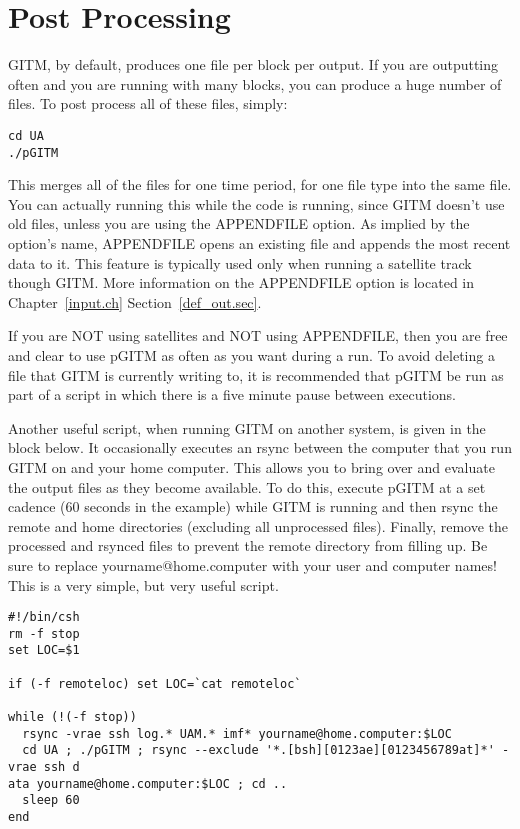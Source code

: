 \section{Post Processing}
\label{post_process.sec}

GITM, by default, produces one file per block per output.  If you are outputting often and you are running with many blocks, you can produce a huge number of files.  To post process all of these files, simply:

\begin{verbatim}
cd UA
./pGITM
\end{verbatim}

This merges all of the files for one time period, for one file type into the same file.  You can actually running this while the code is running, since GITM doesn't use old files, unless you are using the APPENDFILE option.  As implied by the option's name, APPENDFILE opens an existing file and appends the most recent data to it.  This feature is typically used only when running a satellite track though GITM.  More information on the APPENDFILE option is located in Chapter~\ref{input.ch} Section~\ref{def_out.sec}.

If you are NOT using satellites and NOT using APPENDFILE, then you are free and clear to use pGITM as often as you want during a run.  To avoid deleting a file that GITM is currently writing to, it is recommended that pGITM be run as part of a script in which there is a five minute pause between executions.

Another useful script, when running GITM on another system, is given in the block below.  It occasionally executes an rsync between the computer that you run GITM on and your home computer.  This allows you to bring over and evaluate the output files as they become available.  To do this, execute pGITM at a set cadence (60 seconds in the example) while GITM is running and then rsync the remote and home directories (excluding all unprocessed files).  Finally, remove the processed and rsynced files to prevent the remote directory from filling up.  Be sure to replace yourname@home.computer with your user and computer names!  This is a very simple, but very useful script.

\begin{verbatim}
#!/bin/csh
rm -f stop
set LOC=$1

if (-f remoteloc) set LOC=`cat remoteloc`

while (!(-f stop))
  rsync -vrae ssh log.* UAM.* imf* yourname@home.computer:$LOC
  cd UA ; ./pGITM ; rsync --exclude '*.[bsh][0123ae][0123456789at]*' -vrae ssh d
ata yourname@home.computer:$LOC ; cd ..
  sleep 60
end
\end{verbatim}

